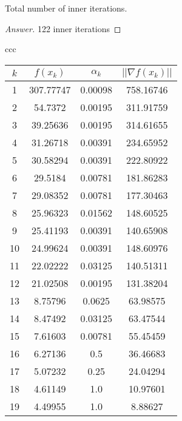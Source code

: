 \documentclass{article}
\newcommand{\norm}[1]{\left|\left|#1\right|\right|}
\begin{document}
        \item Total number of inner iterations.
        \begin{proof}[Answer]
        122 inner iterations
        \end{proof}
        \begin{center}
        \begin{tabular}{ccc}
            \begin{tabular}{|c|c|c|c|}
            \hline 
            $k$ & $f(x_k)$ & $\alpha_k$ & 
            $\norm{\nabla f(x_k)}$ \\
            \hline
            1 & 307.77747 & 0.00098 & 758.16746 \\ 
            \hline
            2 & 54.7372 & 0.00195 & 311.91759 \\ 
            \hline
            3 & 39.25636 & 0.00195 & 314.61655 \\ 
            \hline
            4 & 31.26718 & 0.00391 & 234.65952 \\ 
            \hline
            5 & 30.58294 & 0.00391 & 222.80922 \\ 
            \hline
            6 & 29.5184 & 0.00781 & 181.86283 \\ 
            \hline
            7 & 29.08352 & 0.00781 & 177.30463 \\ 
            \hline
            8 & 25.96323 & 0.01562 & 148.60525 \\ 
            \hline
            9 & 25.41193 & 0.00391 & 140.65908 \\ 
            \hline
            10 & 24.99624 & 0.00391 & 148.60976 \\ 
            \hline
            11 & 22.02222 & 0.03125 & 140.51311 \\ 
            \hline
            12 & 21.02508 & 0.00195 & 131.38204 \\ 
            \hline
            13 & 8.75796 & 0.0625 & 63.98575 \\ 
            \hline
            14 & 8.47492 & 0.03125 & 63.47544 \\ 
            \hline
            15 & 7.61603 & 0.00781 & 55.45459 \\ 
            \hline
            16 & 6.27136 & 0.5 & 36.46683 \\ 
            \hline
            17 & 5.07232 & 0.25 & 24.04294 \\ 
            \hline
            18 & 4.61149 & 1.0 & 10.97601 \\ 
            \hline
            19 & 4.49955 & 1.0 & 8.88627 \\ 

\end{tabular}
\end{tabular}
\end{center}
\end{document}
